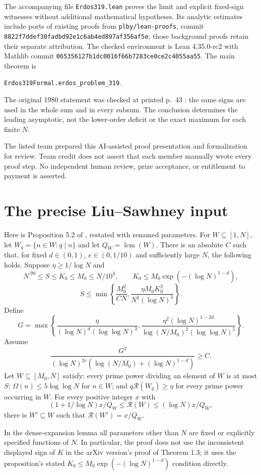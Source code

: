 \documentclass[11pt]{article}
\newcommand{\R}{\mathcal R}
\newcommand{\lcm}{\operatorname{lcm}}
\begin{document}
The accompanying file \texttt{Erdos319.lean} proves the limit and explicit
fixed-sign witnesses without additional mathematical hypotheses. Its
analytic estimates include ports of existing proofs from
\texttt{plby/lean-proofs}, commit
\texttt{8822f7ddef30fadbd92e1c6ab4ed897af356af5e}; those background proofs
retain their separate attribution. The checked environment is Lean
4.35.0-rc2 with Mathlib commit
\texttt{065356127b1dc0016f66b7283ce0ce2c4055aa55}.
The main theorem is
\begin{center}
\texttt{Erdos319Formal.erdos\_problem\_319}.
\end{center}
The original 1980 statement was checked at printed p.~43 \cite{EG}:
the same signs are used in the whole sum and in every subsum.
The conclusion determines the leading asymptotic, not the lower-order
deficit or the exact maximum for each finite $N$.

The listed team prepared this AI-assisted proof presentation and
formalization for review. Team credit does not assert that each member
manually wrote every proof step. No independent human review, prize
acceptance, or entitlement to payment is asserted.

\appendix
\section{The precise Liu--Sawhney input}
Here is Proposition 5.2 of \cite{LS}, restated with renamed parameters.
For $W\subseteq[1,N]$, let $W_q=\{n\in W:q\mid n\}$ and let $Q_W=\lcm(W)$.
There is an absolute $C$ such that, for fixed $d\in(0,1)$,
$e\in(0,1/10)$ and sufficiently large $N$, the following holds.
Suppose $\eta\ge1/\log N$ and
\[
 N^{.99}\le S\le K_0\le M_0\le N/10^4,\qquad
 K_0\le M_0\exp(-(\log N)^{1-d}),
\]
\[
 S\le\min\left\{\frac{M_0^2}{CN},
 \frac{\eta M_0K_0^2}{N^2(\log N)^3}\right\}.
\]
Define
\[
 G=\max\left\{
 \frac{\eta}{(\log N)^d(\log\log N)^3},
 \frac{\eta^2(\log N)^{1-2d}}
 {\log(N/M_0)^2(\log\log N)^5}\right\}.
\]
Assume
\[
 \frac{G^2}{(\log N)^{2e}
  (\log(N/M_0)+(\log N)^{1-d})}\ge C.
\]
Let $W\subseteq[M_0,N]$ satisfy: every prime power dividing an element
of $W$ is at most $S$; $\Omega(n)\le5\log\log N$ for $n\in W$; and
$q\R(W_q)\ge\eta$ for every prime power occurring in $W$.
For every positive integer $x$ with
\[
 (1+1/\log N)x/Q_W\le\R(W)\le(\log N)x/Q_W,
\]
there is $W'\subseteq W$ such that $\R(W')=x/Q_W$.

In the dense-expansion lemma all parameters other than $N$ are fixed
or explicitly specified functions of $N$. In particular, the proof
does not use the inconsistent displayed sign of $K$ in the arXiv
version's proof of Theorem 1.3; it uses the proposition's stated
$K_0\le M_0\exp(-(\log N)^{1-d})$ condition directly.
\end{document}
